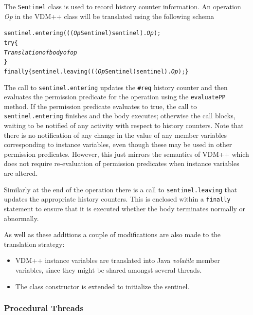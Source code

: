 \documentclass[\pformat,11pt]{article}
\newcommand{\VDM}{VDM++}
\begin{document}
The \texttt{Sentinel} class is used to record history counter
information. An operation \textit{Op} in the \VDM{} class
will be translated using the following schema
\begin{alltt}
    sentinel.entering(((\textit{Op}Sentinel) sentinel).\textit{Op});
    try \{
      \textit{Translation of body of op}
    \}
    finally \{ sentinel.leaving(((\textit{Op}Sentinel) sentinel).\textit{Op});\}
\end{alltt}
The call to \texttt{sentinel.entering} updates the \texttt{\#req}
history counter and then evaluates the permission predicate for the
operation using the \texttt{evaluatePP} method. If the
permission predicate evaluates to true, the call to
\texttt{sentinel.entering} finishes and the body executes; otherwise
the call blocks, waiting to be notified of any activity with respect
to history counters. Note that there is no notification of any change
in the value of any member variables corresponding to instance
variables, even though these may be used in other permission
predicates. However, this just mirrors the semantics of \VDM{} which does
not require re-evaluation of permission predicates when instance
variables are altered.

Similarly at the end of the operation there is a call to
\texttt{sentinel.leaving} that updates the appropriate history
counters. This is enclosed within a \texttt{finally}
statement to ensure that it is executed whether the body terminates
normally or abnormally.

As well as these additions a couple of modifications are also made to
the translation strategy:
\begin{itemize}
\item \VDM{} instance variables are translated into Java
  \textit{volatile} member variables, since they might be shared
  amongst several threads.
\item The class constructor is extended to initialize the sentinel.
\end{itemize}

\subsubsection{Procedural Threads}
\end{document}
